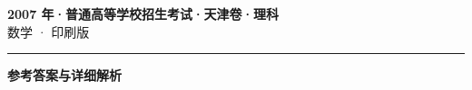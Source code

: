 \documentclass[zihao=5, a4paper]{ctexart}
\begin{document}
\begin{center}
  {\Large\bfseries 2007 年·普通高等学校招生考试·天津卷·理科}\\[4pt]
  {\large 数学 · 印刷版}
\end{center}
\medskip
{}

\par\bigskip\hrule\bigskip
{}
\begin{center}{\large\bfseries 参考答案与详细解析}\end{center}
\smallskip

\end{document}
